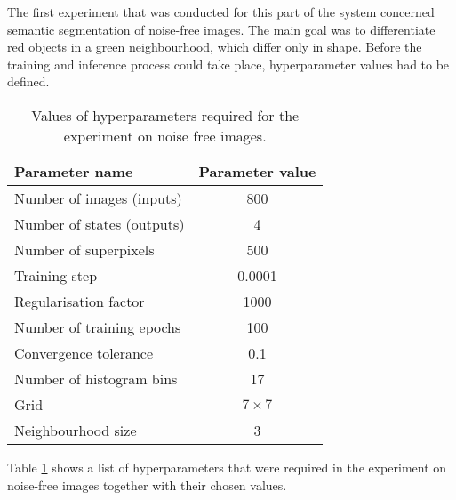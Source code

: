 The first experiment that was conducted for this part of the system concerned semantic segmentation of noise-free images. The main goal was to differentiate red objects in a green neighbourhood, which differ only in shape. Before the training and inference process could take place, hyperparameter values had to be defined. 
\begin{table}[ht]
    \caption{Values of hyperparameters required for the experiment on noise free images.}
    \centering
    \begin{tabular}{|l|c|}
        \hline
        \rowcolor[HTML]{C0C0C0} 
        \textbf{Parameter name} & \textbf{Parameter value} \\ \hline
        Number of images (inputs) & 800 \\ \hline
        Number of states (outputs) & 4 \\ \hline
        Number of superpixels & 500 \\ \hline
        Training step & 0.0001 \\ \hline
        Regularisation factor & 1000 \\ \hline
        Number of training epochs & 100 \\ \hline
        Convergence tolerance & 0.1 \\ \hline
        Number of histogram bins & 17 \\ \hline
        Grid & $7 \times 7$ \\ \hline
        Neighbourhood size & 3 \\ \hline
    \end{tabular}
    \label{table:hyperparameters_nonlinear_noise_free}
\end{table}
Table \ref{table:hyperparameters_nonlinear_noise_free} shows a list of hyperparameters that were required in the experiment on noise-free images together with their chosen values.